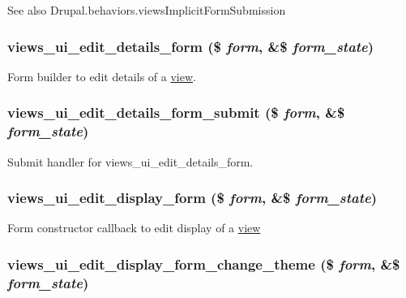 \begin{DoxySeeAlso}{See also}
Drupal.behaviors.viewsImplicitFormSubmission 
\end{DoxySeeAlso}
\hypertarget{admin_8inc_ab0f223be50ef20fa53912b0eb128e7ee}{
\subsubsection[{views\_\-ui\_\-edit\_\-details\_\-form}]{\setlength{\rightskip}{0pt plus 5cm}views\_\-ui\_\-edit\_\-details\_\-form (\$ {\em form}, \/  \&\$ {\em form\_\-state})}}
\label{admin_8inc_ab0f223be50ef20fa53912b0eb128e7ee}
Form builder to edit details of a \hyperlink{classview}{view}. \hypertarget{admin_8inc_a674154b3d2a6a378f121ec2f0a66d52c}{
\subsubsection[{views\_\-ui\_\-edit\_\-details\_\-form\_\-submit}]{\setlength{\rightskip}{0pt plus 5cm}views\_\-ui\_\-edit\_\-details\_\-form\_\-submit (\$ {\em form}, \/  \&\$ {\em form\_\-state})}}
\label{admin_8inc_a674154b3d2a6a378f121ec2f0a66d52c}
Submit handler for views\_\-ui\_\-edit\_\-details\_\-form. \hypertarget{admin_8inc_a82ff573180aaa1d543da73179c22b610}{
\subsubsection[{views\_\-ui\_\-edit\_\-display\_\-form}]{\setlength{\rightskip}{0pt plus 5cm}views\_\-ui\_\-edit\_\-display\_\-form (\$ {\em form}, \/  \&\$ {\em form\_\-state})}}
\label{admin_8inc_a82ff573180aaa1d543da73179c22b610}
Form constructor callback to edit display of a \hyperlink{classview}{view} \hypertarget{admin_8inc_a645b4cf556061727a6d09a0d64770b30}{
\subsubsection[{views\_\-ui\_\-edit\_\-display\_\-form\_\-change\_\-theme}]{\setlength{\rightskip}{0pt plus 5cm}views\_\-ui\_\-edit\_\-display\_\-form\_\-change\_\-theme (\$ {\em form}, \/  \&\$ {\em form\_\-state})}}
